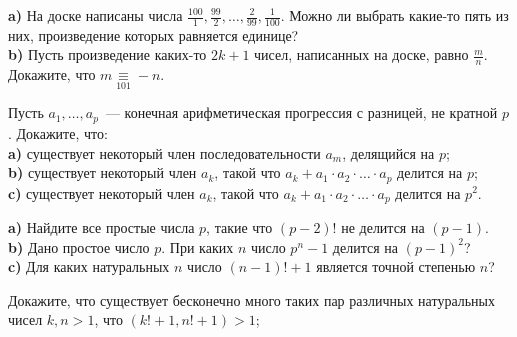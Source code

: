 \begin{problems}
\item \textbf{a)} На доске написаны числа $\frac{100}{1}, \frac{99}{2}, \ldots, \frac{2}{99}, \frac{1}{100}$. Можно ли выбрать какие-то пять из них, произведение которых равняется единице? \\
\textbf{b)} Пусть произведение каких-то $2k+1$ чисел, написанных на доске, равно $\frac{m}{n}$. Докажите, что $m \mathop{\equiv}\limits_{101} -n$.  

\item Пусть $a_1, \ldots, a_p$~--- конечная арифметическая прогрессия с разницей, не кратной $p$. Докажите, что: \\
\textbf{a)} существует некоторый член последовательности $a_m$, делящийся на $p$;\\
\textbf{b)} существует некоторый член $a_k$, такой что $a_k+a_1\cdot a_2\cdot\ldots\cdot a_p$ делится на $p$;\\
\textbf{c)} существует некоторый член $a_k$, такой что $a_k+a_1\cdot a_2\cdot\ldots\cdot a_p$ делится на $p^2$.

\item 
\textbf{a)} Найдите все простые числа $p$, такие что $(p-2)!$ не делится на $(p-1)$.\\
\textbf{b)} Дано простое число $p$. При каких $n$ число $p^n-1$ делится на $(p-1)^2$?\\
\textbf{c)} Для каких натуральных $n$ число $(n-1)!+1$ является точной степенью $n$?


\item Докажите, что существует бесконечно много таких пар различных натуральных чисел 
$k,n>1$, что $(k!+1,n!+1)>1$; 


\end{problems}
